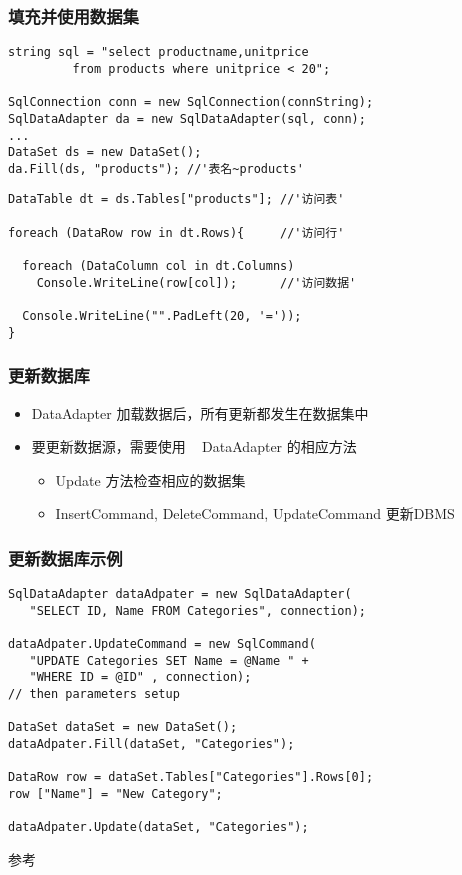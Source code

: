 \begin{frame}[fragile]
\frametitle{填充并使用数据集}   %
\begin{lstlisting}[escapeinside='']
string sql = "select productname,unitprice
         from products where unitprice < 20";

SqlConnection conn = new SqlConnection(connString);
SqlDataAdapter da = new SqlDataAdapter(sql, conn);
...
DataSet ds = new DataSet();
da.Fill(ds, "products"); //'表名~products'
\end{lstlisting}
\pause
\begin{lstlisting}[escapeinside='']
DataTable dt = ds.Tables["products"]; //'访问表'

foreach (DataRow row in dt.Rows){     //'访问行'

  foreach (DataColumn col in dt.Columns)
    Console.WriteLine(row[col]);      //'访问数据'

  Console.WriteLine("".PadLeft(20, '='));
}
\end{lstlisting}
\end{frame}

\begin{frame}
\frametitle{更新数据库}
\begin{itemize}
\item DataAdapter 加载数据后，所有更新都发生在数据集中
\item 要更新数据源，需要使用 ~ DataAdapter 的相应方法
  \begin{itemize}
  \item Update 方法检查相应的数据集
  \item InsertCommand, DeleteCommand, UpdateCommand 更新DBMS
  \end{itemize}
\end{itemize}
\begin{center}
  
\end{center}
\end{frame}

\begin{frame}[fragile]
\frametitle{更新数据库示例}
\begin{lstlisting}
SqlDataAdapter dataAdpater = new SqlDataAdapter(
   "SELECT ID, Name FROM Categories", connection);

dataAdpater.UpdateCommand = new SqlCommand(
   "UPDATE Categories SET Name = @Name " +
   "WHERE ID = @ID" , connection);
// then parameters setup

DataSet dataSet = new DataSet();
dataAdpater.Fill(dataSet, "Categories");   

DataRow row = dataSet.Tables["Categories"].Rows[0];
row ["Name"] = "New Category";

dataAdpater.Update(dataSet, "Categories");
\end{lstlisting}
参考 ~\href{http://msdn2.microsoft.com/zh-cn/library/33y2221y.aspx}
{}
\end{frame}

